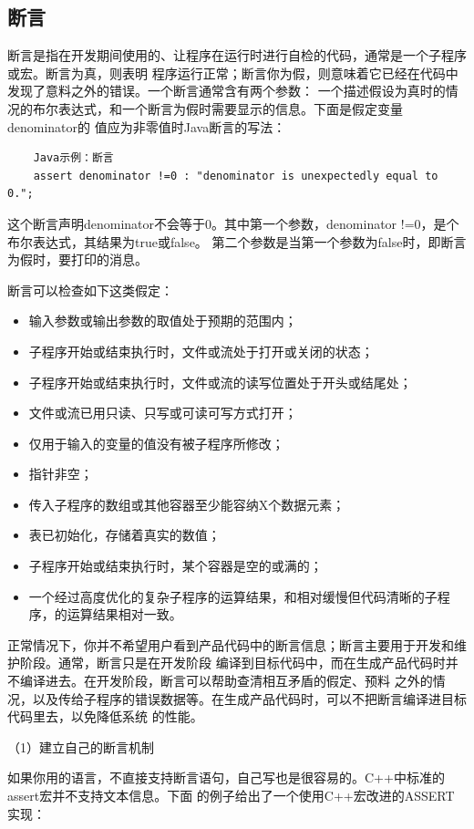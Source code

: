 \documentclass{article}
\begin{document}
\subsection{断言}
断言是指在开发期间使用的、让程序在运行时进行自检的代码，通常是一个子程序或宏。断言为真，则表明
程序运行正常；断言你为假，则意味着它已经在代码中发现了意料之外的错误。一个断言通常含有两个参数：
一个描述假设为真时的情况的布尔表达式，和一个断言为假时需要显示的信息。下面是假定变量denominator的
值应为非零值时Java断言的写法：
\begin{lstlisting}
    Java示例：断言
    assert denominator !=0 : "denominator is unexpectedly equal to 0.";
\end{lstlisting}
这个断言声明denominator不会等于0。其中第一个参数，denominator !=0，是个布尔表达式，其结果为true或false。
第二个参数是当第一个参数为false时，即断言为假时，要打印的消息。
\par
断言可以检查如下这类假定：
\begin{itemize}
    \item 输入参数或输出参数的取值处于预期的范围内；
    \item 子程序开始或结束执行时，文件或流处于打开或关闭的状态；
    \item 子程序开始或结束执行时，文件或流的读写位置处于开头或结尾处；
    \item 文件或流已用只读、只写或可读可写方式打开；
    \item 仅用于输入的变量的值没有被子程序所修改；
    \item 指针非空；
    \item 传入子程序的数组或其他容器至少能容纳X个数据元素；
    \item 表已初始化，存储着真实的数值；
    \item 子程序开始或结束执行时，某个容器是空的或满的；
    \item 一个经过高度优化的复杂子程序的运算结果，和相对缓慢但代码清晰的子程序，的运算结果相对一致。
\end{itemize}
正常情况下，你并不希望用户看到产品代码中的断言信息；断言主要用于开发和维护阶段。通常，断言只是在开发阶段
编译到目标代码中，而在生成产品代码时并不编译进去。在开发阶段，断言可以帮助查清相互矛盾的假定、预料
之外的情况，以及传给子程序的错误数据等。在生成产品代码时，可以不把断言编译进目标代码里去，以免降低系统
的性能。
\par
（1）建立自己的断言机制
\par
如果你用的语言，不直接支持断言语句，自己写也是很容易的。C++中标准的assert宏并不支持文本信息。下面
的例子给出了一个使用C++宏改进的ASSERT实现：
\end{document}
